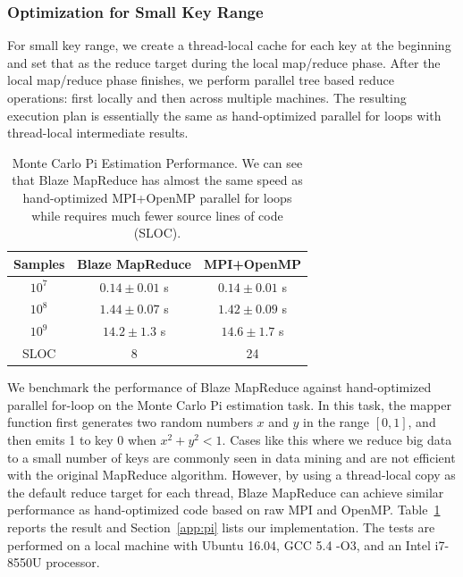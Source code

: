\subsubsection{Optimization for Small Key Range}

For small key range, we create a thread-local cache for each key at the beginning and set that as the reduce target during the local map/reduce phase.
After the local map/reduce phase finishes, we perform parallel tree based reduce operations: first locally and then across multiple machines.
The resulting execution plan is essentially the same as hand-optimized parallel for loops with thread-local intermediate results.

\begin{table}
  \caption{Monte Carlo Pi Estimation Performance.
  We can see that Blaze MapReduce has almost the same speed as hand-optimized MPI+OpenMP parallel for loops while requires much fewer source lines of code (SLOC).}
  \label{tab:pi}
  \begin{center}
  \begin{tabular}{ccc}
    \hline
    Samples & Blaze MapReduce & MPI+OpenMP\\
    \hline
    $10^7$ & $0.14\pm 0.01$ s& $0.14\pm 0.01$ s \\
    $10^8$ & $1.44\pm 0.07$ s& $1.42\pm 0.09$ s \\
    $10^9$ & $14.2\pm 1.3$ s& $14.6\pm 1.7$ s \\
    \hline
    SLOC & 8 & 24 \\
    \hline
  \end{tabular}
  \end{center}
\end{table}

We benchmark the performance of Blaze MapReduce against hand-optimized parallel for-loop on the Monte Carlo Pi estimation task.
In this task, the mapper function first generates two random numbers $x$ and $y$ in the range $[0, 1]$, and then emits 1 to key 0 when $x^2 + y^2 < 1$.
Cases like this where we reduce big data to a small number of keys are commonly seen in data mining and are not efficient with the original MapReduce algorithm.
However, by using a thread-local copy as the default reduce target for each thread, Blaze MapReduce can achieve similar performance as hand-optimized code based on raw MPI and OpenMP.
Table~\ref{tab:pi} reports the result and Section~\ref{app:pi} lists our implementation.
The tests are performed on a local machine with Ubuntu 16.04, GCC 5.4 -O3, and an Intel i7-8550U processor.

